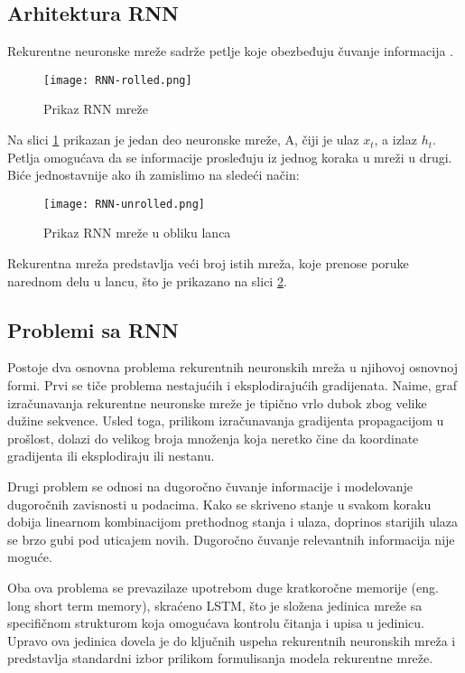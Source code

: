 \documentclass[a4paper]{article}
\begin{document}
\subsection{Arhitektura RNN}

Rekurentne neuronske mreže sadrže petlje koje obezbeđuju čuvanje informacija \cite{understandingLSTM}.

\begin{figure}[htp]
    \centering
    \texttt{[image: RNN-rolled.png]}
    \caption{Prikaz RNN mreže}
    \label{fig:rnn}
\end{figure}

Na slici \ref{fig:rnn} prikazan je jedan deo neuronske mreže, A, čiji je ulaz $x_t$, a izlaz $h_t$. Petlja omogućava da se informacije prosleđuju iz jednog koraka u mreži u drugi. Biće jednostavnije ako ih zamislimo na sledeći način:

\begin{figure}[htp]
    \centering
    \texttt{[image: RNN-unrolled.png]}
    \caption{Prikaz RNN mreže u obliku lanca}
    \label{fig:rnn2}
\end{figure}

Rekurentna mreža predstavlja veći broj istih mreža, koje prenose poruke narednom delu u lancu, što je prikazano na slici \ref{fig:rnn2}. 

\subsection{Problemi sa RNN}
Postoje dva osnovna problema rekurentnih neuronskih mreža u njihovoj osnovnoj formi. Prvi se tiče problema nestajućih i eksplodirajućih gradijenata. Naime, graf izračunavanja rekurentne neuronske mreže je tipično vrlo dubok zbog velike dužine sekvence. Usled toga, prilikom izračunavanja gradijenta propagacijom u prošlost, dolazi do velikog broja množenja koja neretko čine da koordinate gradijenta ili eksplodiraju ili nestanu.

Drugi problem se odnosi na dugoročno čuvanje informacije i modelovanje dugoročnih zavisnosti u podacima. Kako se skriveno stanje u svakom koraku dobija linearnom kombinacijom prethodnog stanja i ulaza, doprinos starijih ulaza se brzo gubi pod uticajem novih. Dugoročno čuvanje relevantnih informacija nije moguće.

Oba ova problema se prevazilaze upotrebom duge kratkoročne memorije (eng. long short term memory), skraćeno LSTM, što je složena jedinica mreže sa specifičnom strukturom koja omogućava kontrolu čitanja i upisa u jedinicu. Upravo ova jedinica dovela je do ključnih uspeha rekurentnih neuronskih mreža i predstavlja standardni izbor prilikom formulisanja modela rekurentne mreže. \cite{matf}
\end{document}
